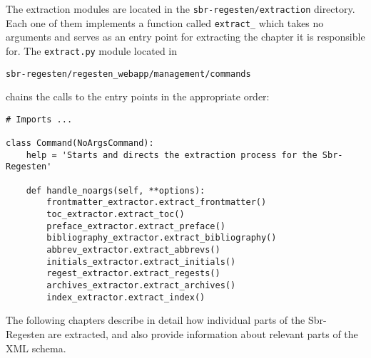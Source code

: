 The extraction modules are located in the
\texttt{sbr-regesten/extraction} directory. Each one of them
implements a function called \texttt{extract\_<part-of-book>} which
takes no arguments and serves as an entry point for extracting the
chapter it is responsible for. The \texttt{extract.py} module located
in

\begin{verbatim}
sbr-regesten/regesten_webapp/management/commands
\end{verbatim}

chains the calls to the entry points in the appropriate order:

\begin{verbatim}
# Imports ...

class Command(NoArgsCommand):
    help = 'Starts and directs the extraction process for the Sbr-Regesten'

    def handle_noargs(self, **options):
        frontmatter_extractor.extract_frontmatter()
        toc_extractor.extract_toc()
        preface_extractor.extract_preface()
        bibliography_extractor.extract_bibliography()
        abbrev_extractor.extract_abbrevs()
        initials_extractor.extract_initials()
        regest_extractor.extract_regests()
        archives_extractor.extract_archives()
        index_extractor.extract_index()
\end{verbatim}

The following chapters describe in detail how individual parts of the
Sbr-Regesten are extracted, and also provide information about
relevant parts of the XML schema.
